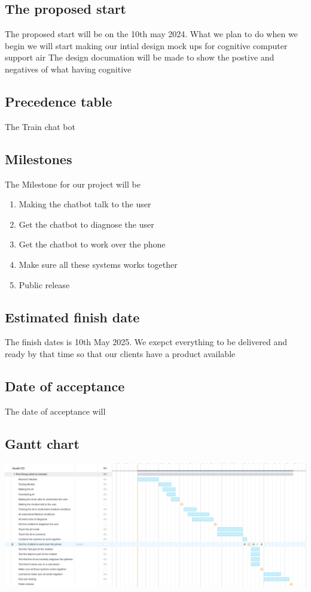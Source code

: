 \documentclass{article}
\begin{document}
\subsection{The proposed start}
The proposed start will be on the 10th may 2024. What we plan to do when we begin we will start making our intial design mock ups for cognitive computer support air
The design documation will be made to show the postive and negatives of what having cognitive 

\subsection{Precedence table}
The 
Train chat bot

\subsection{Milestones}
The Milestone for our project will be 
	\begin{enumerate}
		\item Making the chatbot talk to the user
		\item Get the chatbot to diagnose the user
		\item Get the chatbot to work over the phone
		\item Make sure all these systems works together
		\item Public release
	\end{enumerate}

\subsection{Estimated finish date}

The finish dates is 10th May 2025. We exepct everything to be delivered and ready by that time so that our clients have a product available 

\subsection{Date of acceptance}
The date of acceptance will 

\subsection{Gantt chart}
\includegraphics[scale=0.25]{gantt}
\end{document}
